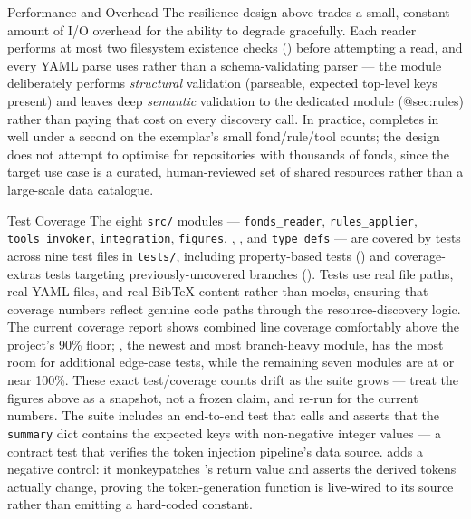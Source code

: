 \documentclass[
  ignorenonframetext,
]{beamer}
\begin{document}
\begin{frame}{Performance and Overhead}
\protect{}\label{performance-and-overhead}
The resilience design above trades a small, constant amount of I/O
overhead for the ability to degrade gracefully. Each reader performs at
most two filesystem existence checks ()
before attempting a read, and every YAML parse uses
 rather than a schema-validating parser ---
the module deliberately performs \emph{structural} validation
(parseable, expected top-level keys present) and leaves deep
\emph{semantic} validation to the dedicated
 module (@sec:rules) rather than paying
that cost on every discovery call. In practice,
 completes in well under a
second on the exemplar's small fond/rule/tool counts; the design does
not attempt to optimise for repositories with thousands of fonds, since
the target use case is a curated, human-reviewed set of shared resources
rather than a large-scale data catalogue.
\end{frame}

\begin{frame}{Test Coverage}
\protect{}\label{test-coverage}
The eight \texttt{src/} modules --- \texttt{fonds\_reader},
\texttt{rules\_applier}, \texttt{tools\_invoker}, \texttt{integration},
\texttt{figures}, ,
, and \texttt{type\_defs} --- are covered
by tests across nine test files in \texttt{tests/}, including
property-based tests () and
coverage-extras tests targeting previously-uncovered branches
(). Tests use real file paths, real
YAML files, and real BibTeX content rather than mocks, ensuring that
coverage numbers reflect genuine code paths through the
resource-discovery logic. The current coverage report shows combined
line coverage comfortably above the project's 90\% floor;
, the newest and most branch-heavy
module, has the most room for additional edge-case tests, while the
remaining seven modules are at or near 100\%. These exact test/coverage
counts drift as the suite grows --- treat the figures above as a
snapshot, not a frozen claim, and re-run
 for the current
numbers. The  suite includes an
end-to-end test that calls  and asserts
that the \texttt{summary} dict contains the expected keys with
non-negative integer values --- a contract test that verifies the token
injection pipeline's data source.
 adds a negative control:
it monkeypatches 's return value and
asserts the derived tokens actually change, proving the token-generation
function is live-wired to its source rather than emitting a hard-coded
constant.
\end{frame}
\end{document}

